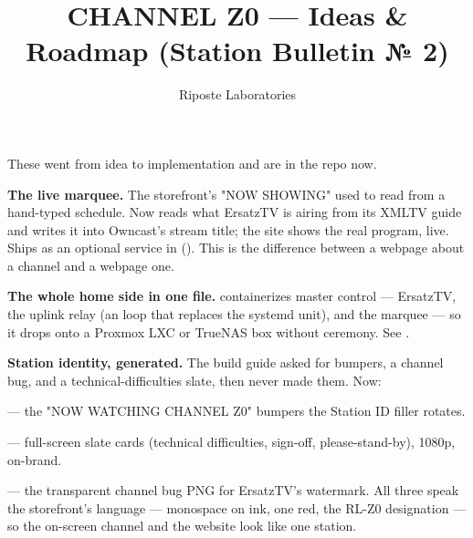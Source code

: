\documentclass[fontpath=fonts/,logopath=logo/]{riposte-doc}
\title{CHANNEL Z0 — Ideas \& Roadmap (Station Bulletin № 2)}
\author{Riposte Laboratories}
\date{}
\begin{document}
\ripmakehead



These went from idea to implementation and are in the repo now.

\begin{ripbullets}
\item \textbf{The live marquee.} The storefront's "NOW SHOWING" used to read from a hand-typed schedule. Now  reads what ErsatzTV is  airing from its XMLTV guide and writes it into Owncast's stream title; the site shows the real program, live. Ships as an optional service in  (). This is the difference between a webpage about a channel and a webpage  one.
\item \textbf{The whole home side in one file.}  containerizes master control — ErsatzTV, the uplink relay (an  loop that replaces the systemd unit), and the marquee — so it drops onto a Proxmox LXC or TrueNAS box without ceremony. See .
\item \textbf{Station identity, generated.} The build guide asked for bumpers, a channel bug, and a technical-difficulties slate, then never made them. Now:
\begin{ripbullets}
\item {} — the "NOW WATCHING CHANNEL Z0" bumpers the Station ID filler rotates.
\item {} — full-screen slate cards (technical difficulties, sign-off, please-stand-by), 1080p, on-brand.
\item {} — the transparent channel bug PNG for ErsatzTV's watermark. All three speak the storefront's language — monospace on ink, one red, the RL-Z0 designation — so the on-screen channel and the website look like one station.
\end{ripbullets}


\end{ripbullets}
\end{document}
